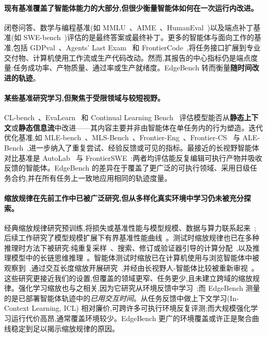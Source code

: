 \paragraph{现有基准覆盖了智能体能力的大部分,但很少衡量智能体如何在一次运行内改进。} 闭卷问答、数学与编程基准(如 MMLU~\cite{hendrycks2021mmlu}、AIME~\cite{maa2026aime}、HumanEval~\cite{chen2021humaneval})以及端点补丁基准(如 SWE-bench~\cite{jimenez2024swebench})评估的是最终答案或最终补丁。更多的智能体与面向工作的基准,包括 GDPval~\cite{patwardhan2025gdpval}、Agents' Last Exam~\cite{sun2026agents} 和 FrontierCode~\cite{lu2026frontiercode},将任务接口扩展到专业交付物、计算机使用工作流或生产代码改动。然而,其报告的中心指标仍是端点度量:任务成功率、产物质量、通过率或生产就绪度。EdgeBench 转而衡量\textbf{随时间改进的轨迹}。

\paragraph{某些基准研究学习,但聚焦于受限领域与较短视野。} CL-bench~\cite{dou2026clbench}、EvaLearn~\cite{dou2025evalearn} 和 Continual Learning Bench~\cite{asawa2026clbench} 评估模型能否从\textbf{静态上下文}或\textbf{静态信息流}中改进——其内容主要并非由智能体在单任务内的行为塑造。迭代优化基准,如 MLE-bench~\cite{chan2025mle}、MLS-Bench~\cite{lyu2026mlsbench}、Frontier-Eng~\cite{chi2026frontiereng}、Frontier-CS~\cite{mang2025frontiercs} 与 ALE-Bench~\cite{imajuku2025alebench},进一步纳入了重复尝试、经验反馈或可见的指标。最接近的长视野智能体对比基准是 AutoLab~\cite{xu2026autolab} 与 FrontierSWE~\cite{chu2026frontierswe}:两者均评估能反复编辑可执行产物并吸收反馈的智能体。EdgeBench 的差异在于覆盖了更广泛的可执行领域、采用日级任务合约,并在所有任务上一致地应用相同的轨迹度量。

\paragraph{缩放规律在先前工作中已被广泛研究,但从多样化真实环境中学习仍未被充分探索。} 经典缩放规律研究预训练,将损失或基准性能与模型规模、数据与算力联系起来~\cite{kaplan2020,hoffmann2022};后续工作研究了模型规模扩展下有界基准性能曲线~\cite{bhagia2024ladder,owen2024predictable,ruan2024observational,zhang2026prescriptive}。测试时缩放规律也已在多种推理时方法下被研究:纯重复采样~\cite{chen2021humaneval,li2022alphacode,brown2024monkeys}、搜索、修订或验证器引导的计算分配~\cite{snell2024scalingllm,wunips2024inference},以及推理模型中的长链思维推理~\cite{openaio1,deepseek2025r1}。智能体测试时缩放已在计算机使用与浏览智能体中被观察到~\cite{openai2025cua,wei2025browsecomp},通过交互长度缩放开展研究~\cite{shen2025thinkingvsdoing},并经由长视野人-智能体比较被重新审视~\cite{mang2026humansdontjustsample}。这些研究更接近我们的设置,但覆盖的领域更窄、任务更少,且未建立跨域的缩放规律。强化学习缩放也与之相关,因为它研究从环境反馈中学习~\cite{hilton2023scalingrl,khatri2025rlart};而 EdgeBench 测量的是已部署智能体轨迹中的\textit{已用交互时间}。从任务反馈中做上下文学习(In-Context Learning, ICL) 相对廉价,可跨许多可执行环境反复评测;而大规模强化学习运行代价高昂,通常覆盖环境较少。EdgeBench 更广的环境覆盖或许正是聚合曲线稳定到足以揭示缩放规律的原因。

